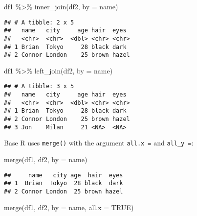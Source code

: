 \documentclass[
]{book}
\newenvironment{Shaded}{\begin{snugshade}}{\end{snugshade}}
\newcommand{\AttributeTok}[1]{\textcolor[rgb]{0.77,0.63,0.00}{#1}}
\newcommand{\ConstantTok}[1]{\textcolor[rgb]{0.00,0.00,0.00}{#1}}
\newcommand{\FunctionTok}[1]{\textcolor[rgb]{0.00,0.00,0.00}{#1}}
\newcommand{\NormalTok}[1]{#1}
\newcommand{\SpecialCharTok}[1]{\textcolor[rgb]{0.00,0.00,0.00}{#1}}
\newcommand{\StringTok}[1]{\textcolor[rgb]{0.31,0.60,0.02}{#1}}
\begin{document}
\begin{Shaded}
\begin{Highlighting}[]
\NormalTok{df1 }\SpecialCharTok{\%\textgreater{}\%} \FunctionTok{inner\_join}\NormalTok{(df2, }\AttributeTok{by =} \StringTok{\textquotesingle{}name\textquotesingle{}}\NormalTok{)}
\end{Highlighting}
\end{Shaded}

\begin{verbatim}
## # A tibble: 2 x 5
##   name   city     age hair  eyes 
##   <chr>  <chr>  <dbl> <chr> <chr>
## 1 Brian  Tokyo     28 black dark 
## 2 Connor London    25 brown hazel
\end{verbatim}

\begin{Shaded}
\begin{Highlighting}[]
\NormalTok{df1 }\SpecialCharTok{\%\textgreater{}\%} \FunctionTok{left\_join}\NormalTok{(df2, }\AttributeTok{by =} \StringTok{\textquotesingle{}name\textquotesingle{}}\NormalTok{)}
\end{Highlighting}
\end{Shaded}

\begin{verbatim}
## # A tibble: 3 x 5
##   name   city     age hair  eyes 
##   <chr>  <chr>  <dbl> <chr> <chr>
## 1 Brian  Tokyo     28 black dark 
## 2 Connor London    25 brown hazel
## 3 Jon    Milan     21 <NA>  <NA>
\end{verbatim}

Base R uses \texttt{merge()} with the argument \texttt{all.x\ =} and \texttt{all\_y\ =}:

\begin{Shaded}
\begin{Highlighting}[]
\FunctionTok{merge}\NormalTok{(df1, df2, }\AttributeTok{by =} \StringTok{\textquotesingle{}name\textquotesingle{}}\NormalTok{)}
\end{Highlighting}
\end{Shaded}

\begin{verbatim}
##     name   city age  hair  eyes
## 1  Brian  Tokyo  28 black  dark
## 2 Connor London  25 brown hazel
\end{verbatim}

\begin{Shaded}
\begin{Highlighting}[]
\FunctionTok{merge}\NormalTok{(df1, df2, }\AttributeTok{by =} \StringTok{\textquotesingle{}name\textquotesingle{}}\NormalTok{, }\AttributeTok{all.x =} \ConstantTok{TRUE}\NormalTok{)}
\end{Highlighting}
\end{Shaded}
\end{document}
